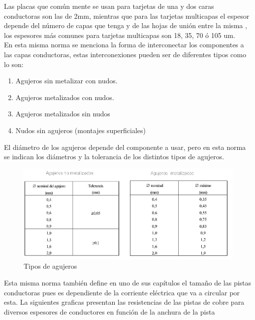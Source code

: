 \documentclass[a4paper,12pt,twoside]{proyectotanquesecci}
\begin{document}
Las placas que común mente se usan para  tarjetas de una y dos caras conductoras son las  de 2mm, mientras que para las tarjetas multicapas  el espesor depende del número de capas que tenga  y de las hojas de unión entre la misma , los espesores más comunes para tarjetas multicapas son 18, 35, 70 ó 105 um.\\

En esta misma norma  se menciona la forma de interconectar los componentes  a las capas conductoras, estas interconexiones pueden ser de diferentes tipos como lo son:

\begin{enumerate}
\item Agujeros sin metalizar con nudos.
\item Agujeros metalizados con nudos.
\item Agujeros metalizados sin nudos 
\item Nudos sin agujeros (montajes superficiales)
\end{enumerate}

El diámetro de los agujeros depende del componente a usar,  pero en esta norma  se indican los diámetros y la tolerancia de los distintos tipos de agujeros.

\begin{figure}[h]
\centering
\includegraphics[scale=0.8]{tabla1.jpg}
\renewcommand{\figurename}{Fig.}
\caption{Tipos de agujeros}
\label{Tipos de agujeros}
\end{figure}

Esta misma norma  también define en uno de sus capítulos  el tamaño de las pistas conductoras pues es dependiente  de la corriente eléctrica que va a circular por esta. 
La siguientes graficas presentan las resistencias de las pistas de cobre para diversos espesores de conductores  en función de la anchura de la pista
\end{document}

